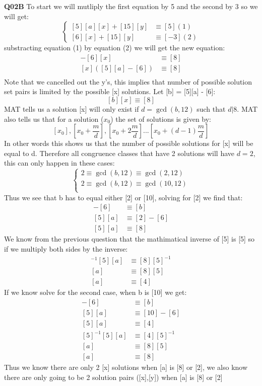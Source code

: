 \documentclass[11pt]{article}
\begin{document}
\textbf{Q02B} To start we will mutliply the first equation by 5 and the second by 3 so we will get:
$$
\begin{cases}
[5][a][x] + [15][y] & \equiv [5]       (1)\\
[6][x] + [15][y] & \equiv [-3]        (2)
\end{cases}
$$
substracting equation (1) by equation (2) we will get the new equation:
\begin{align*}
 [5][a][x] - [6][x] & \equiv [8] \\
 [x]([5][a] - [6]) & \equiv [8] \\
\end{align*}
Note that we cancelled out the y's, this implies that number of possible solution set pairs is limited by the possible [x] solutions. Let [b] = [5][a] - [6]:
\[ [b][x] \equiv [8] \]
MAT tells us a solution [x] will only exist if $d = \gcd(b,12)$ such that $d|8$. MAT also tells us that for a solution ($x_0$) the set of solutions is given by:
\[  [x_0], [x_0 + \frac{m}{d}], [x_0 + 2\frac{m}{d}]...[x_0 + (d-1)\frac{m}{d}]  \]
In other words this shows us that the number of possible solutions for [x] will be equal to d. Therefore all congruence classes that have 2 solutions will have $d = 2$, this can only happen in these cases:
$$
\begin{cases}
2 \equiv \gcd(b, 12) \equiv \gcd(2,12)\\
2 \equiv \gcd(b, 12) \equiv \gcd(10,12)\\
\end{cases}
$$
Thus we see that b has to equal either [2] or [10], solving for [2] we find that:
\begin{align*}
 [5][a] - [6]  & \equiv [b] \\
          [5][a] & \equiv [2]  - [6] \\
          [5][a]  & \equiv [8] 
\end{align*}
We know from the previous question that the mathimatical inverse of [5] is [5] so if we multiply both sides by the inverse:
\begin{align*}
          [5]^{-1}[5][a]  & \equiv [8][5]^{-1} \\
          [a]  & \equiv [8][5] \\
          [a]  & \equiv [4] 
\end{align*}
If we know solve for the second case, when b is [10] we get:
\begin{align*}
 [5][a] - [6]  & \equiv [b] \\
          [5][a] & \equiv [10]  - [6] \\
          [5][a]  & \equiv [4]  \\
          [5]^{-1}[5][a]  & \equiv [4][5]^{-1} \\
          [a]  & \equiv [8][5] \\
          [a]  & \equiv [8]
\end{align*}
Thus we know there are only 2 [x] solutions when [a] is [8] or [2], we also know there are only going to be 2 solution pairs ([x],[y]) when [a] is [8] or [2]
\end{document}
